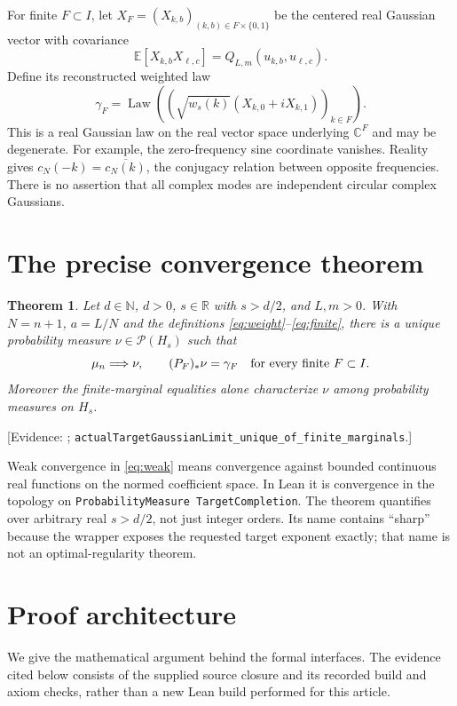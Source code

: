 \documentclass[11pt]{amsart}
\newtheorem{theorem}{Theorem}[section]
\theoremstyle{remark}\newtheorem{remark}[theorem]{Remark}
\newcommand{\R}{\mathbb R}\newcommand{\C}{\mathbb C}\newcommand{\Z}{\mathbb Z}\newcommand{\N}{\mathbb N}
\newcommand{\E}{\mathbb E}\newcommand{\Prob}{\mathcal P}
\newcommand{\evidence}[1]{\textup{[Evidence: #1]}}
\begin{document}
For finite $F\subset I$, let $X_F=(X_{k,b})_{(k,b)\in F\times\{0,1\}}$ be the centered real Gaussian vector with covariance
\begin{equation}\label{eq:cov}
 \E[X_{k,b}X_{\ell,c}]=Q_{L,m}(u_{k,b},u_{\ell,c}).
\end{equation}
Define its reconstructed weighted law
\begin{equation}\label{eq:finite}
 \gamma_F=\operatorname{Law}\left(
 \left(\sqrt{w_s(k)}(X_{k,0}+iX_{k,1})\right)_{k\in F}\right).
\end{equation}
This is a real Gaussian law on the real vector space underlying $\C^F$ and may be degenerate. For example, the zero-frequency sine coordinate vanishes. Reality gives $c_N(-k)=\overline{c_N(k)}$, the conjugacy relation between opposite frequencies. There is no assertion that all complex modes are independent circular complex Gaussians.

\section{The precise convergence theorem}
\begin{theorem}\label{thm:main}
Let $d\in\N$, $d>0$, $s\in\R$ with $s>d/2$, and $L,m>0$. With $N=n+1$, $a=L/N$ and the definitions \eqref{eq:weight}--\eqref{eq:finite}, there is a unique probability measure $\nu\in\Prob(H_s)$ such that
\begin{equation}\label{eq:weak}
 \mu_n\Longrightarrow\nu,\qquad (P_F)_*\nu=\gamma_F
 \quad\hbox{for every finite }F\subset I.
\end{equation}
Moreover the finite-marginal equalities alone characterize $\nu$ among probability measures on $H_s$.
\end{theorem}
\evidence{;
\texttt{actualTargetGaussianLimit\_unique\_of\_finite\_marginals}.}

Weak convergence in \eqref{eq:weak} means convergence against bounded continuous real functions on the normed coefficient space. In Lean it is convergence in the topology on \texttt{ProbabilityMeasure TargetCompletion}. The theorem quantifies over arbitrary real $s>d/2$, not just integer orders. Its name contains ``sharp'' because the wrapper exposes the requested target exponent exactly; that name is not an optimal-regularity theorem.

\section{Proof architecture}
We give the mathematical argument behind the formal interfaces. The evidence cited below consists of the supplied source closure and its recorded build and axiom checks, rather than a new Lean build performed for this article.
\end{document}
